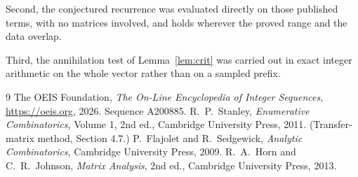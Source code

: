 \documentclass[11pt,a4paper]{article}
\theoremstyle{plain}
\theoremstyle{definition}
\begin{document}
Second, the conjectured recurrence was evaluated directly on those published terms, with no
matrices involved, and holds wherever the proved range and the data overlap.

Third, the annihilation test of Lemma~\ref{lem:crit} was carried out in exact integer
arithmetic on the whole vector rather than on a sampled prefix.

\begin{thebibliography}{9}
 The OEIS Foundation, \emph{The On-Line Encyclopedia of Integer
Sequences}, \url{https://oeis.org}, 2026. Sequence A200885.
 R.~P.~Stanley, \emph{Enumerative Combinatorics}, Volume 1, 2nd ed.,
Cambridge University Press, 2011. (Transfer-matrix method, Section 4.7.)
 P.~Flajolet and R.~Sedgewick, \emph{Analytic Combinatorics}, Cambridge
University Press, 2009.
 R.~A.~Horn and C.~R.~Johnson, \emph{Matrix Analysis}, 2nd ed., Cambridge
University Press, 2013.
\end{thebibliography}
\end{document}
